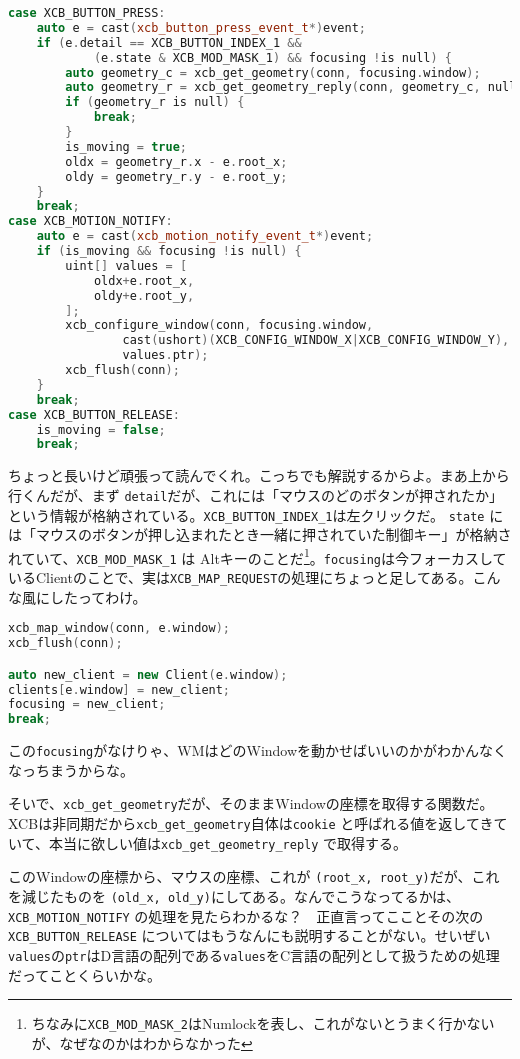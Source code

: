 \documentclass[12pt,a4paper]{jsarticle}
\begin{document}
\begin{lstlisting}[language=C++]
case XCB_BUTTON_PRESS:
	auto e = cast(xcb_button_press_event_t*)event;
	if (e.detail == XCB_BUTTON_INDEX_1 &&
			(e.state & XCB_MOD_MASK_1) && focusing !is null) {
		auto geometry_c = xcb_get_geometry(conn, focusing.window);
		auto geometry_r = xcb_get_geometry_reply(conn, geometry_c, null);
		if (geometry_r is null) {
			break;
		}
		is_moving = true;
		oldx = geometry_r.x - e.root_x;
		oldy = geometry_r.y - e.root_y;
	}
	break;
case XCB_MOTION_NOTIFY:
	auto e = cast(xcb_motion_notify_event_t*)event;
	if (is_moving && focusing !is null) {
		uint[] values = [
			oldx+e.root_x,
			oldy+e.root_y,
		];
		xcb_configure_window(conn, focusing.window,
				cast(ushort)(XCB_CONFIG_WINDOW_X|XCB_CONFIG_WINDOW_Y),
				values.ptr);
		xcb_flush(conn);
	}
	break;
case XCB_BUTTON_RELEASE:
	is_moving = false;
	break;
\end{lstlisting}

ちょっと長いけど頑張って読んでくれ。こっちでも解説するからよ。まあ上から行くんだが、まず \lstinline{detail}だが、これには「マウスのどのボタンが押されたか」という情報が格納されている。\lstinline{XCB_BUTTON_INDEX_1}は左クリックだ。 \lstinline{state} には「マウスのボタンが押し込まれたとき一緒に押されていた制御キー」が格納されていて、\lstinline{XCB_MOD_MASK_1} は Altキーのことだ\footnote{ちなみに\lstinline{XCB_MOD_MASK_2}はNumlockを表し、これがないとうまく行かないが、なぜなのかはわからなかった}。\lstinline{focusing}は今フォーカスしているClientのことで、実は\lstinline{XCB_MAP_REQUEST}の処理にちょっと足してある。こんな風にしたってわけ。

\begin{lstlisting}[language=C++]
xcb_map_window(conn, e.window);
xcb_flush(conn);

auto new_client = new Client(e.window);
clients[e.window] = new_client;
focusing = new_client;
break;
\end{lstlisting}

この\lstinline{focusing}がなけりゃ、WMはどのWindowを動かせばいいのかがわかんなくなっちまうからな。

そいで、\lstinline{xcb_get_geometry}だが、そのままWindowの座標を取得する関数だ。XCBは非同期だから\lstinline{xcb_get_geometry}自体は\lstinline{cookie} と呼ばれる値を返してきていて、本当に欲しい値は\lstinline{xcb_get_geometry_reply} で取得する。

このWindowの座標から、マウスの座標、これが \lstinline{(root_x, root_y)}だが、これを減じたものを \lstinline{(old_x, old_y)}にしてある。なんでこうなってるかは、\lstinline{XCB_MOTION_NOTIFY} の処理を見たらわかるな？　正直言ってこことその次の \lstinline{XCB_BUTTON_RELEASE} についてはもうなんにも説明することがない。せいぜい\lstinline{values}の\lstinline{ptr}はD言語の配列である\lstinline{values}をC言語の配列として扱うための処理だってことくらいかな。
\end{document}
